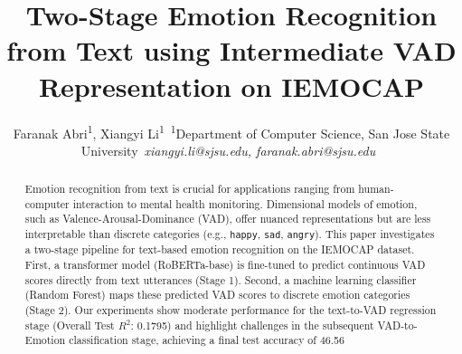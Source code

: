 \documentclass[conference]{IEEEtran}
\newcommand*{\affaddr}[1]{#1}
\newcommand*{\affmark}[1][*]{\textsuperscript{#1}}
\newcommand*{\email}[1]{\textit{#1}}
\begin{document}
\title{Two-Stage Emotion Recognition from Text using Intermediate VAD Representation on IEMOCAP}

\author{%
    Faranak Abri\affmark[1], Xiangyi Li\affmark[1]\
    \affaddr{\affmark[1]Department of Computer Science, San Jose State University}\
    \email{xiangyi.li@sjsu.edu, faranak.abri@sjsu.edu}\
}

\IEEEoverridecommandlockouts

\maketitle

\begin{abstract}
Emotion recognition from text is crucial for applications ranging from human-computer interaction to mental health monitoring. Dimensional models of emotion, such as Valence-Arousal-Dominance (VAD), offer nuanced representations but are less interpretable than discrete categories (e.g., \texttt{happy}, \texttt{sad}, \texttt{angry}). This paper investigates a two-stage pipeline for text-based emotion recognition on the IEMOCAP dataset. First, a transformer model (RoBERTa-base) is fine-tuned to predict continuous VAD scores directly from text utterances (Stage 1). Second, a machine learning classifier (Random Forest) maps these predicted VAD scores to discrete emotion categories (Stage 2). Our experiments show moderate performance for the text-to-VAD regression stage (Overall Test $R^2$: 0.1795) and highlight challenges in the subsequent VAD-to-Emotion classification stage, achieving a final test accuracy of 46.56%
\end{abstract}
\end{document}
